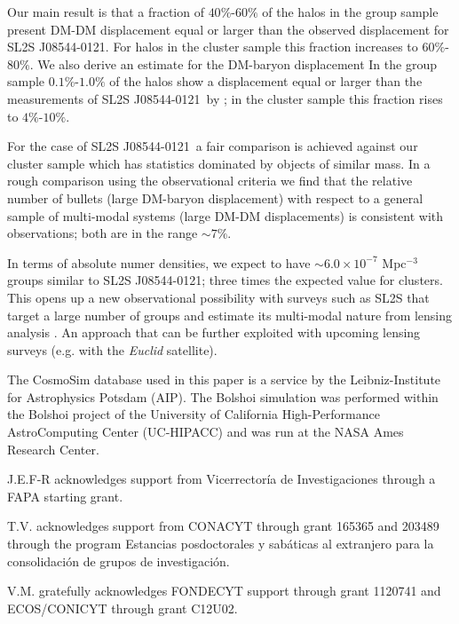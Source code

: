 \documentclass{emulateapj}
\newcommand{\bullg}{SL2S J08544-0121}
\begin{document}
Our main result is that a fraction of $40\%$-$60\%$ of the halos
in the group sample present DM-DM displacement equal or larger than the
observed displacement for \bullg. For halos in the cluster sample this
fraction increases to $60\%$-$80\%$. We also derive an
estimate for the DM-baryon displacement In the group sample
$0.1\%$-$1.0\%$ of the halos show a displacement equal or larger than
the  measurements of \bullg\ by \citep{Gastaldello}; in the cluster
sample this fraction rises to $4\%$-$10\%$. 

For the case of \bullg\ a fair comparison is achieved against our cluster
sample which has statistics dominated by objects of similar mass. In
a rough comparison using the observational criteria \citep{Foex2013,
  Gastaldello} we find that the relative number of bullets
(large DM-baryon displacement) with respect to a general sample of
multi-modal systems (large DM-DM displacements) is consistent with
observations; both are in the range $\sim 7\%$. 

In terms of absolute numer densities, we expect to have $\sim 6.0\times
10^{-7}$ Mpc$^{-3}$ groups similar to \bullg; three times the expected
value for clusters. This opens up a new observational possibility with surveys
such as SL2S that target a large number of groups and estimate its
multi-modal nature from lensing analysis \citep{Foex2013}. An approach
that can be further exploited with upcoming lensing surveys (e.g. with
the {\it Euclid} satellite). 

The CosmoSim database used in this paper is a service by the
Leibniz-Institute for Astrophysics Potsdam (AIP). The  Bolshoi
simulation was performed within the Bolshoi project of the University
of California High-Performance AstroComputing Center (UC-HIPACC) and
was run at the NASA Ames Research Center. 

J.E.F-R acknowledges support from Vicerrector\'ia de
Investigaciones through a FAPA starting grant.

T.V. acknowledges support from CONACYT through grant 165365 and
203489 through the program Estancias posdoctorales y sab\'aticas al
extranjero para la consolidaci\'on de grupos de investigaci\'on.  

V.M. gratefully acknowledges FONDECYT support through grant 1120741
and ECOS/CONICYT through grant C12U02. 


 
\end{document}
